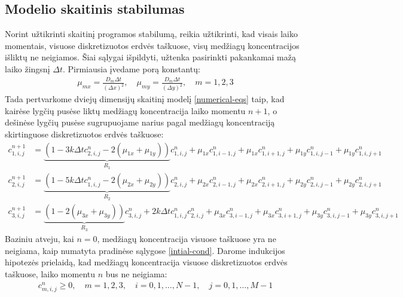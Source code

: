 \subsection{Modelio skaitinis stabilumas}

Norint užtikrinti skaitinį programos stabilumą, reikia užtikrinti, kad visais laiko momentais, visuose diskretizuotos erdvės taškuose, visų medžiagų koncentracijos išliktų ne neigiamos. Šiai sąlygai išpildyti, užtenka pasirinkti pakankamai mažą laiko žingsnį $\Delta t$. Pirmiausia įvedame porą konstantų:
\begin{align*}
\mu_{mx} = \frac{D_m\Delta t}{(\Delta x)^2}, \quad
\mu_{my} = \frac{D_m\Delta t}{(\Delta y)^2}, \quad m = 1, 2, 3
\end{align*}
Tada pertvarkome dviejų dimensijų skaitinį modelį \eqref{numerical-eqs} taip, kad kairėse lygčių pusėse liktų medžiagų koncentracija laiko momentu $n+1$, o dešinėse lygčių pusėse sugrupuojame narius pagal medžiagų koncentraciją skirtinguose diskretizuotos erdvės taškuose:
\begin{subequations} \label{eqs:r-coefs}
  \begin{align}
  c^{n+1}_{1,i,j}&=
  \underbrace{(1-3k\Delta tc^{n}_{2,i,j}-2(\mu_{1x}+\mu_{1y}))}_{R_1}c^n_{1,i,j}
  +\mu_{1x}c^n_{1,i-1,j}+\mu_{1x}c^n_{1,i+1,j}+\mu_{1y}c^n_{1,i,j-1}+\mu_{1y}c^n_{1,i,j+1} \label{r-coefs1}\\
  c^{n+1}_{2,i,j}&=
  \underbrace{(1-5k\Delta tc^{n}_{1,i,j}-2(\mu_{2x}+\mu_{2y}))}_{R_2}c^n_{2,i,j}
  +\mu_{2x}c^n_{2,i-1,j}+\mu_{2x}c^n_{2,i+1,j}+\mu_{2y}c^n_{2,i,j-1}+\mu_{2y}c^n_{2,i,j+1} \label{r-coefs2}\\
  c^{n+1}_{3,i,j}&=
  \underbrace{(1-2(\mu_{3x} + \mu_{3y}))}_{R_3}c^n_{3,i,j}+2k\Delta tc^{n}_{1,i,j}c^{n}_{2,i,j} 
  +\mu_{3x}c^n_{3,i-1,j}+\mu_{3x}c^n_{3,i+1,j}
  +\mu_{3y}c^n_{3,i,j-1}+\mu_{3y}c^n_{3,i,j+1}
  \label{r-coefs3}
  \end{align}
\end{subequations}
Baziniu atveju, kai $n=0$, medžiagų koncentracija visuose taškuose yra ne neigiama, kaip numatyta pradinėse sąlygose \eqref{intial-cond}. Darome indukcijos hipotezės prielaidą, kad medžiagų koncentracija visuose diskretizuotos erdvės taškuose, laiko momentu $n$ bus ne neigiama:
\begin{align} \label{induction-assumption}
  c^n_{m,i,j} \geqslant 0, \quad m=1,2,3,\quad i=0,1,\dots,N-1,\quad j=0,1,\dots,M-1
\end{align}

